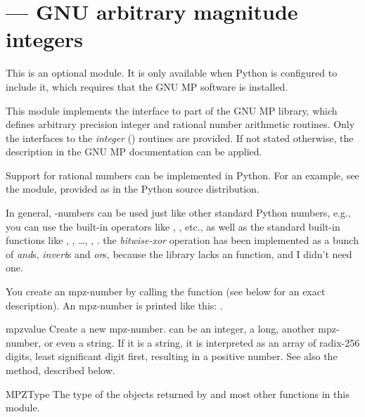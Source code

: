 \section{ ---
         GNU arbitrary magnitude integers}



This is an optional module.  It is only available when Python is
configured to include it, which requires that the GNU MP software is
installed.

This module implements the interface to part of the GNU MP library,
which defines arbitrary precision integer and rational number
arithmetic routines.  Only the interfaces to the \emph{integer}
() routines are provided. If not stated
otherwise, the description in the GNU MP documentation can be applied.

Support for rational numbers can be
implemented in Python.  For an example, see the
 module, provided as
 in the Python source distribution.

In general, -numbers can be used just like other standard
Python numbers, e.g., you can use the built-in operators like \code{+},
\code{*}, etc., as well as the standard built-in functions like
, , \ldots, ,
.   the \emph{bitwise-xor}
operation has been implemented as a bunch of \emph{and}s,
\emph{invert}s and \emph{or}s, because the library lacks an
 function, and I didn't need one.

You create an mpz-number by calling the function  (see
below for an exact description). An mpz-number is printed like this:
.


\begin{funcdesc}{mpz}{value}
  Create a new mpz-number.  can be an integer, a long,
  another mpz-number, or even a string. If it is a string, it is
  interpreted as an array of radix-256 digits, least significant digit
  first, resulting in a positive number. See also the 
  method, described below.
\end{funcdesc}

\begin{datadesc}{MPZType}
  The type of the objects returned by  and most other
  functions in this module.
\end{datadesc}


